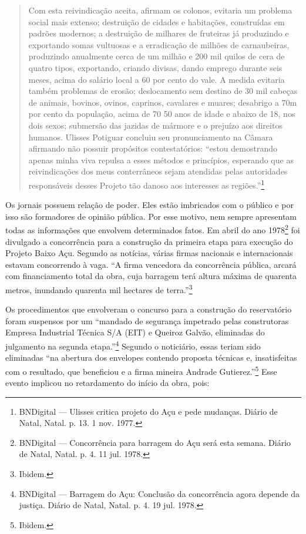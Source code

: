 \begin{refsection}
    \begin{quotation}
        Com esta reivindicação aceita, afirmam os colonos, evitaria um problema social mais extenso; destruição de cidades e habitações, construídas em padrões modernos; a destruição de milhares de fruteiras já produzindo e exportando somas vultuosas e a erradicação de milhões de carnaubeiras, produzindo anualmente cerca de um milhão e 200 mil quilos de cera de quatro tipos, exportando, criando divisas, dando emprego durante seis meses, acima do salário local a 60 por cento do vale. A medida evitaria também problemas de erosão; deslocamento sem destino de 30 mil cabeças de animais, bovinos, ovinos, caprinos, cavalares  e muares; desabrigo a 70m por cento da população, acima de 70 50 anos de idade e abaixo de 18, nos dois sexos; submersão  das jazidas de mármore e o prejuízo aos direitos humanos. Ulisses Potiguar concluiu seu pronunciamento na Câmara afirmando não possuir propósitos contestatórios: ``estou demostrando apenas minha viva repulsa a esses métodos e princípios, esperando que as reivindicações dos meus conterrâneos sejam atendidas pelas autoridades responsáveis desses Projeto tão danoso aos interesses as regiões.''\footnote{BNDigital --- Ulisses critica projeto do Açu e pede mudanças. Diário de Natal, Natal. p. 13. 1 nov. 1977.}
    \end{quotation}

    Os jornais possuem relação de poder. Eles estão imbricados com o público e por isso são formadores de opinião pública. Por esse motivo, nem sempre apresentam todas as informações que envolvem determinados fatos. Em abril do ano 1978\footnote{BNDigital --- Concorrência para barragem do Açu será esta semana. Diário de Natal, Natal. p. 4. 11 jul. 1978. } foi divulgado a concorrência para a construção da primeira etapa para execução do Projeto Baixo Açu. Segundo as notícias, várias firmas nacionais e internacionais estavam concorrendo à vaga. ``A firma vencedora da concorrência pública, arcará com financiamento total da obra, cuja barragem terá altura máxima de quarenta metros, inundando quarenta mil hectares de terra.''\footnote{Ibidem.}

    Os procedimentos que envolveram o concurso para a construção do reservatório foram suspensos por um ``mandado de segurança impetrado pelas construtoras Empresa Industrial Técnica S/A (EIT) e Queiroz Galvão, eliminadas do julgamento na segunda etapa.''\footnote{BNDigital --- Barragem do Açu: Conclusão da concorrência agora depende da justiça. Diário de Natal, Natal. p. 4. 19 jul. 1978.} Segundo o noticiário, essas teriam sido eliminadas ``na abertura dos envelopes contendo proposta técnicas e, insatisfeitas com o resultado, que beneficiou e a firma mineira Andrade Gutierez.''\footnote{Ibidem.} Esse evento implicou no retardamento do início da obra, pois:


\end{refsection}
